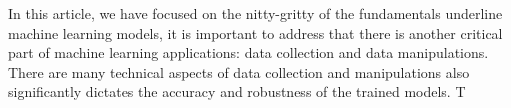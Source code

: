 In this article, we have focused on the nitty-gritty of the fundamentals underline machine learning models, it is important to address that there is another critical part of machine learning applications: data collection and data manipulations. There are many technical aspects of data collection and manipulations also significantly dictates the accuracy and robustness of the trained models. T